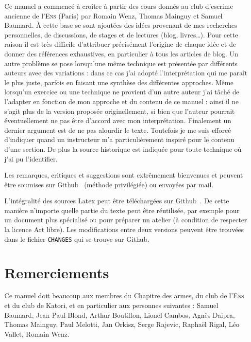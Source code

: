 Ce manuel a commencé à croître à partir des cours donnés au club d'escrime ancienne de l'\textsc{Ens} (Paris) par Romain Wenz, Thomas Mainguy et Samuel Baumard.
À cette base se sont ajoutées des idées provenant de mes recherches personnelles, de discussions, de stages et de lectures (blog, livres…).
Pour cette raison il est très difficile d'attribuer précisément l'origine de chaque idée et de donner des références exhaustives, en particulier à tous les articles de blog.
Un autre problème se pose lorsqu'une même technique est présentée par différents auteurs avec des variations : dans ce cas j'ai adopté l'interprétation qui me paraît le plus juste, parfois en faisant une synthèse des différentes approches.
Même lorsqu'un exercice ou une technique ne provient d'un autre auteur j'ai tâché de l'adapter en fonction de mon approche et du contenu de ce manuel : ainsi il ne s'agit plus de la version proposée originellement, si bien que l'auteur pourrait éventuellement ne pas être d'accord avec mon interprétation.
Finalement un dernier argument est de ne pas alourdir le texte.
Toutefois je me suis efforcé d'indiquer quand un instructeur m'a particulièrement inspiré pour le contenu d'une section.
De plus la source historique est indiquée pour toute technique où j'ai pu l'identifier.

Les remarques, critiques et suggestions sont extrêmement bienvenues et peuvent être soumises sur Github~\footnotemark{} (méthode privilégiée) ou envoyées par mail.

L'intégralité des sources Latex peut être téléchargées sur Github~\footnotemark{}.%
De cette manière n'importe quelle partie du texte peut être réutilisée, par exemple pour un document plus spécialisé ou pour préparer un atelier (à condition de respecter la licence Art libre).
Les modifications entre deux versions peuvent être trouvées dans le fichier \texttt{CHANGES} qui se trouve sur Github.


\section{Remerciements}


Ce manuel doit beaucoup aux membres du Chapitre des armes, du club de l'\textsc{Ens} et du club de Katori, et en particulier aux personnes suivantes : Samuel Baumard, Jean-Paul Blond, Arthur Boutillon, Lionel Cambos, Agnès Daipra, Thomas Mainguy, Paul Melotti, Jan Orkisz, Serge Rajevic, Raphaël Rigal, Léo Vallet, Romain Wenz.
